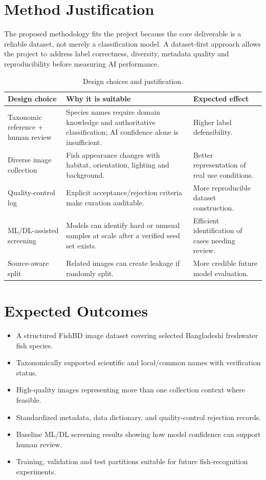 \documentclass[12pt,a4paper]{article}
\begin{document}
\section{Method Justification}

The proposed methodology fits the project because the core deliverable is a reliable dataset, not merely a classification model. A dataset-first approach allows the project to address label correctness, diversity, metadata quality and reproducibility before measuring AI performance.

\begin{table}[H]
\centering
\caption{Design choices and justification.}
\small
\begin{tabularx}{\textwidth}{|p{1.3in}|X|p{1.3in}|}
\hline
\textbf{Design choice} & \textbf{Why it is suitable} & \textbf{Expected effect} \\
\hline
Taxonomic reference + human review & Species names require domain knowledge and authoritative classification; AI confidence alone is insufficient. & Higher label defensibility. \\
\hline
Diverse image collection & Fish appearance changes with habitat, orientation, lighting and background. & Better representation of real use conditions. \\
\hline
Quality-control log & Explicit acceptance/rejection criteria make curation auditable. & More reproducible dataset construction. \\
\hline
ML/DL-assisted screening & Models can identify hard or unusual samples at scale after a verified seed set exists. & Efficient identification of cases needing review. \\
\hline
Source-aware split & Related images can create leakage if randomly split. & More credible future model evaluation. \\
\hline
\end{tabularx}
\end{table}


\section{Expected Outcomes}

\begin{itemize}[leftmargin=0.35in]
    \item A structured FishBD image dataset covering selected Bangladeshi freshwater fish species.
    \item Taxonomically supported scientific and local/common names with verification status.
    \item High-quality images representing more than one collection context where feasible.
    \item Standardized metadata, data dictionary, and quality-control rejection records.
    \item Baseline ML/DL screening results showing how model confidence can support human review.
    \item Training, validation and test partitions suitable for future fish-recognition experiments.
\end{itemize}
\end{document}
